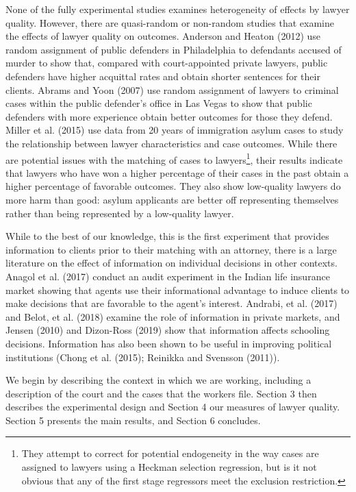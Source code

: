 \documentclass[oneside,12pt]{article}
\begin{document}
None of the fully experimental studies examines heterogeneity of effects by lawyer quality. However, there are quasi-random or non-random studies that examine the effects of lawyer quality on outcomes. Anderson and Heaton (2012) use random assignment of public defenders in Philadelphia to defendants accused of murder to show that, compared with court-appointed private lawyers, public defenders have higher acquittal rates and obtain shorter sentences for their clients. Abrams and Yoon (2007) use random assignment of lawyers to criminal cases within the public defender’s office in Las Vegas to show that public defenders with more experience obtain better outcomes for those they defend. Miller et al. (2015) use data from 20 years of immigration asylum cases to study the relationship between lawyer characteristics and case outcomes. While there are potential issues with the matching of cases to lawyers\footnote{They attempt to correct for potential endogeneity in the way cases are assigned to lawyers using a Heckman selection regression, but is it not obvious that any of the first stage regressors meet the exclusion restriction.},  their results indicate that lawyers who have won a higher percentage of their cases in the past obtain a higher percentage of favorable outcomes. They also show low-quality lawyers do more harm than good: asylum applicants are better off representing themselves rather than being represented by a low-quality lawyer.

While to the best of our knowledge, this is the first experiment that provides information to clients prior to their matching with an attorney, there is a large literature on the effect of information on individual decisions in other contexts. Anagol et al. (2017) conduct an audit experiment in the Indian life insurance market showing that agents use their informational advantage to induce clients to make decisions that are favorable to the agent’s interest. Andrabi, et al. (2017) and Belot, et al. (2018) examine the role of information in private markets, and Jensen (2010) and Dizon-Ross (2019) show that information affects schooling decisions. Information has also been shown to be useful in improving political institutions (Chong et al. (2015); Reinikka and Svensson (2011)). 

We begin by describing the context in which we are working, including a description of the court and the cases that the workers file. Section 3 then describes the experimental design and Section 4 our measures of lawyer quality. Section 5 presents the main results, and Section 6 concludes. 
\end{document}
